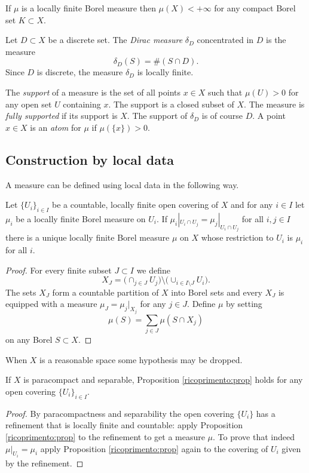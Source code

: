 \begin{ex} If $\mu$ is a locally finite Borel measure then $\mu(X)<+\infty$ for any compact Borel set $K\subset X$.
\end{ex}

\begin{example}
Let $D\subset X$ be a discrete set. The \emph{Dirac measure} $\delta_D$ concentrated in $D$ is the measure
$$\delta_D(S) = \#(S\cap D).$$
Since $D$ is discrete, the measure $\delta_D$ is locally finite.
\end{example}

The \emph{support} of a measure is the set of all points $x\in X$ such that $\mu(U)>0$ for any open set $U$ containing $x$. The support is a closed subset of $X$. The measure is \emph{fully supported} if its support is $X$. The support of $\delta_D$ is of course $D$. A point $x\in X$ is an \emph{atom} for $\mu$ if $\mu(\{x\})>0$.

\subsection{Construction by local data}
A measure can be defined using local data in the following way.

\begin{prop} \label{ricoprimento:prop}
Let $\{U_i\}_{i\in I}$ be a countable, locally finite open covering of $X$ and for any $i\in I$ let $\mu_i$ be a locally finite Borel measure on $U_i$. If $\mu_i|_{U_i\cap U_j} = \mu_j|_{U_i\cap U_j}$ for all $i,j\in I$ there is a unique locally finite Borel measure  $\mu$ on $X$ whose restriction to $U_i$ is $\mu_i$ for all $i$.
\end{prop}
\begin{proof}
For every finite subset $J\subset I$ we define 
$$X_J = \big(\cap_{j\in J} U_j\big) \setminus \big(\cup_{i\in I\setminus J} U_i\big).$$ 
The sets $X_J$ form a countable partition of $X$ into Borel sets and every $X_J$ is equipped with a measure $\mu_J = \mu_j|_{X_j}$ for any $j\in J$. Define $\mu$ by setting
$$\mu(S)= \sum_{j\in J} \mu(S\cap X_j)$$
on any Borel $S\subset X$. 
\end{proof}

When $X$ is a reasonable space some hypothesis may be dropped.

\begin{prop} \label{ricoprimento2:prop}
If $X$ is paracompact and separable, Proposition \ref{ricoprimento:prop} holds for any open covering $\{U_i\}_{i\in I}$.
\end{prop}
\begin{proof}
By paracompactness and separability the open covering $\{U_i\}$ has a refinement that is locally finite and countable: apply Proposition \ref{ricoprimento:prop} to the refinement to get a measure $\mu$. To prove that indeed $\mu|_{U_i} = \mu_i$ apply Proposition \ref{ricoprimento:prop} again to the covering of $U_i$ given by the refinement.
\end{proof}

